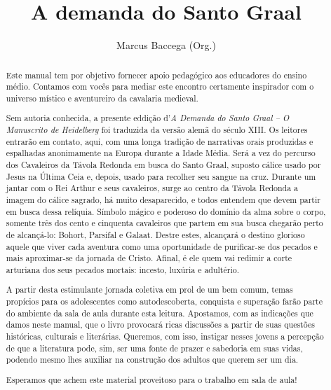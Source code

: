 \documentclass[11pt]{extarticle}
\begin{document}
\newcommand{\AutorLivro}{Marcus Baccega (Org.)}
\newcommand{\TituloLivro}{A demanda do Santo Graal}
\newcommand{\Tema}{Ficção, mistério e fantasia}
\newcommand{\Genero}{Conto, crônica e novela}
\newcommand{\imagemCapa}{./images/PNLD0006-01.png}
\newcommand{\issnppub}{---}
\newcommand{\issnepub}{---}
\newcommand{\colaborador}{\textbf{Clarice Assalim, Bruno Gradella e Vicente Castro} é uma pessoa incrível e vai fazer um bom serviço.}




\title{\TituloLivro}
\author{\AutorLivro}
\def\authornotes{\colaborador}

\date{}
\maketitle


\begin{abstract}

Este manual tem por objetivo fornecer apoio pedagógico aos educadores do 
ensino médio. Contamos com vocês para mediar este encontro certamente 
inspirador com o universo místico e aventureiro da cavalaria medieval.

Sem autoria conhecida, a presente eddição d'\emph{A Demanda do Santo Graal -- 
O Manuscrito de Heidelberg} foi traduzida da versão alemã do século XIII. 
Os leitores entrarão em contato, aqui, com uma longa tradição de narrativas orais 
produzidas e espalhadas anonimamente na Europa durante a Idade Média. Será a vez 
do percurso dos Cavaleiros da Távola Redonda em busca do Santo Graal, suposto 
cálice usado por Jesus na Última Ceia e, depois, usado para recolher seu sangue na cruz. 
Durante um jantar com o Rei Arthur e seus cavaleiros, surge ao centro da Távola Redonda 
a imagem do cálice sagrado, há muito desaparecido, e todos entendem que devem partir 
em busca dessa relíquia. Símbolo mágico e poderoso do domínio da alma sobre o corpo, 
somente três dos cento e cinquenta cavaleiros que partem em sua busca chegarão perto 
de alcançá-lo: Bohort, Parsifal e Galaat. Destre estes, alcançará o destino glorioso 
aquele que viver cada aventura como uma oportunidade de purificar-se dos pecados e mais 
aproximar-se da jornada de Cristo. Afinal, é ele quem vai redimir a corte arturiana 
dos seus pecados mortais: incesto, luxúria e adultério.

A partir desta estimulante jornada coletiva em prol de um bem comum, temas 
propícios para os adolescentes como autodescoberta, conquista e superação 
farão parte do ambiente da sala de aula durante esta leitura. Apostamos, 
com as indicações que damos neste manual, que o livro provocará ricas 
discussões a partir de suas questões históricas, culturais e literárias. 
Queremos, com isso, instigar nesses jovens a percepção de que a literatura 
pode, sim, ser uma fonte de prazer e sabedoria em suas vidas, podendo mesmo 
lhes auxiliar na construção dos adultos que querem ser um dia. 

Esperamos que achem este material proveitoso para o trabalho em sala de aula!

\end{abstract}
\end{document}
